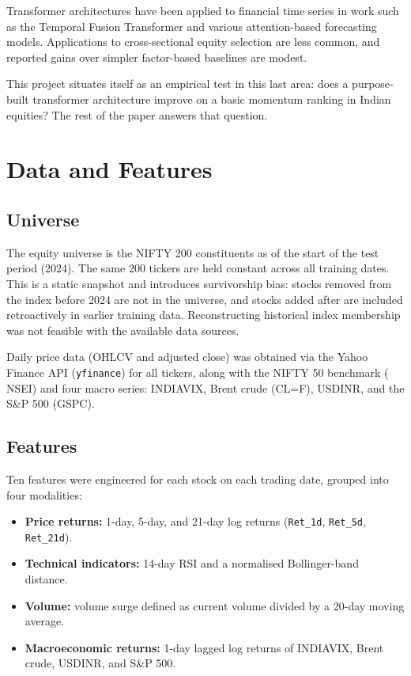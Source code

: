 \documentclass[conference]{IEEEtran}
\begin{document}
Transformer architectures have been applied to financial time series in work such as the Temporal Fusion Transformer \cite{lim2021} and various attention-based forecasting models. Applications to cross-sectional equity selection are less common, and reported gains over simpler factor-based baselines are modest.

This project situates itself as an empirical test in this last area: does a purpose-built transformer architecture improve on a basic momentum ranking in Indian equities? The rest of the paper answers that question.

\section{Data and Features}

\subsection{Universe}

The equity universe is the NIFTY 200 constituents as of the start of the test period (2024). The same 200 tickers are held constant across all training dates. This is a static snapshot and introduces survivorship bias: stocks removed from the index before 2024 are not in the universe, and stocks added after are included retroactively in earlier training data. Reconstructing historical index membership was not feasible with the available data sources.

Daily price data (OHLCV and adjusted close) was obtained via the Yahoo Finance API (\texttt{yfinance}) for all tickers, along with the NIFTY 50 benchmark ($\hat{}$NSEI) and four macro series: INDIAVIX, Brent crude (CL=F), USDINR, and the S\&P 500 ($\hat{}$GSPC).

\subsection{Features}

Ten features were engineered for each stock on each trading date, grouped into four modalities:

\begin{itemize}
    \item \textbf{Price returns:} 1-day, 5-day, and 21-day log returns (\texttt{Ret\_1d}, \texttt{Ret\_5d}, \texttt{Ret\_21d}).
    \item \textbf{Technical indicators:} 14-day RSI and a normalised Bollinger-band distance.
    \item \textbf{Volume:} volume surge defined as current volume divided by a 20-day moving average.
    \item \textbf{Macroeconomic returns:} 1-day lagged log returns of INDIAVIX, Brent crude, USDINR, and S\&P 500.
\end{itemize}
\end{document}
